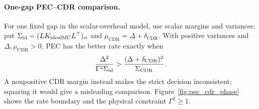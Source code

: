\documentclass[a4paper,onecolumn,unpublished,nopdfoutputerror]{quantumarticle}
\theoremstyle{plain}
\theoremstyle{definition}
\newcommand{\CDR}{\mathrm{CDR}}
\newcommand{\1}{\mathbf{1}}
\begin{document}
\paragraph{One-gap PEC--CDR comparison.}
For one fixed gap in the scalar-overhead model, use scalar margins and variances: put $\Sigma_{\rm id}=(LK_{\rm idealMC}L^\top)_{ii}$ and $\mu_{\CDR}=\Delta+\delta_{\CDR}$. With positive variances and $\Delta,\mu_{\CDR}>0$, PEC has the better rate exactly when
\begin{equation}\label{eq:pec_cdr_boundary}
\frac{\Delta^2}{\Gamma^2\Sigma_{\rm id}}
>\frac{(\Delta+\delta_{\CDR})^2}{\Sigma_{\CDR}}.
\end{equation}
A nonpositive CDR margin instead makes the strict decision inconsistent; squaring it would give a misleading comparison. Figure~\ref{fig:pec_cdr_phase} shows the rate boundary and the physical constraint $\Gamma^2\ge1$.
\end{document}
